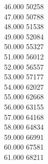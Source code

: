{ 46.000	50258 \\
 47.000	50788 \\
 48.000	51538 \\
 49.000	52084 \\
 50.000	55327 \\
 51.000	56012 \\
 52.000	56557 \\
 53.000	57177 \\
 54.000	62027 \\
 55.000	62668 \\
 56.000	63155 \\
 57.000	64168 \\
 58.000	64834 \\
 59.000	66991 \\
 60.000	67581 \\
 61.000	68211 \\
}
